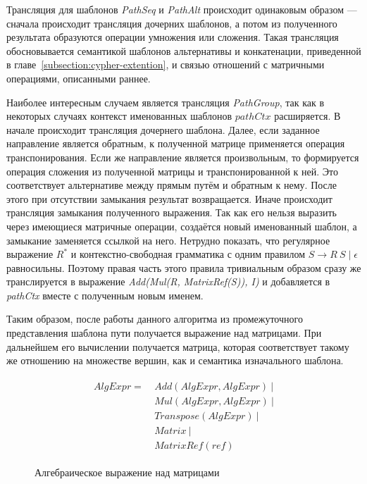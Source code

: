 Трансляция для шаблонов \textit{PathSeq} и \textit{PathAlt} происходит одинаковым образом --- сначала происходит трансляция дочерних шаблонов, а потом из полученного результата образуются операции умножения или сложения. Такая трансляция обосновывается семантикой шаблонов альтернативы и конкатенации, приведенной в главе~\ref{subsection:cypher-extention}, и связью отношений с матричными операциями, описанными раннее.

Наиболее интересным случаем является трансляция \textit{Path\-Group}, так как в некоторых случаях контекст именованных шаблонов $pathCtx$ расширяется. В начале происходит трансляция дочернего шаблона. Далее, если заданное направление является обратным, к полученной матрице применяется операция транспонирования. Если же направление является произвольным, то формируется операция сложения из полученной матрицы и транспонированной к ней. Это соответствует альтернативе между прямым путём и обратным к нему. После этого при отсутствии замыкания результат возвращается. Иначе происходит трансляция замыкания полученного выражения. Так как его нельзя выразить через имеющиеся матричные операции, создаётся новый именованный шаблон, а замыкание заменяется ссылкой на него. Нетрудно показать, что регулярное выражение $R^*$ и контекстно-свободная грамматика с одним правилом $S \rightarrow R~S \mid \epsilon$ равносильны. Поэтому правая часть этого правила тривиальным образом сразу же транслируется в выражение \textit{Add(Mul(R, MatrixRef(S)), I)} и добавляется в \textit{pathCtx} вместе с полученным новым именем.

Таким образом, после работы данного алгоритма из промежуточного представления шаблона пути получается выражение над матрицами. При дальнейшем его вычислении получается матрица, которая соответствует такому же отношению на множестве вершин, как и семантика изначального шаблона.



\begin{figure}[H]
\begin{align*}
\begin{split}
AlgExpr= ~ &Add(AlgExpr, AlgExpr)~|\\
           &Mul(AlgExpr, AlgExpr)~|\\
           &Transpose(AlgExpr)~|\\
           &Matrix~|\\
           &MatrixRef(ref)
\end{split}
\end{align*}
\caption{Алгебраическое выражение над матрицами}
\label{fig:alg-expr}
\end{figure}

